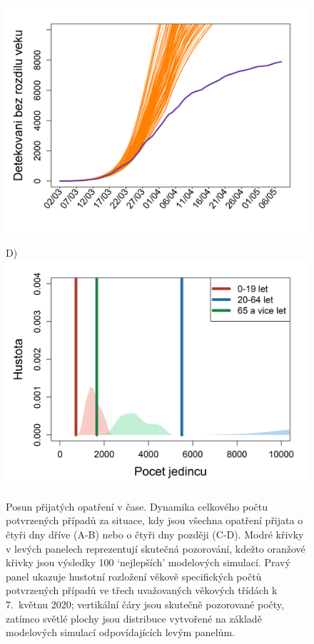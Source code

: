 \begin{figure}
\begin{center}
\begin{minipage}[m]{0.45\textwidth}
			\includegraphics[width = \textwidth]{pic/sc_4later.png}
		\end{minipage}
		\begin{minipage}[m]{0.45\textwidth}
			D) \\
			\includegraphics[width = \textwidth]{pic/sc_4later_PDF.png}
		\end{minipage}
	\end{center}
	\caption{Posun přijatých opatření v čase. Dynamika celkového počtu potvrzených případů za situace, kdy jsou všechna opatření přijata o čtyři dny dříve (A-B) nebo o čtyři dny později (C-D). Modré křivky v levých panelech reprezentují skutečná pozorování, kdežto oranžové křivky jsou výsledky 100 `nejlepších' modelových simulací. Pravý panel ukazuje hustotní rozložení věkově specifických počtů potvrzených případů ve třech uvažovaných věkových třídách k 7.\ květnu 2020; vertikální čáry jsou skutečně pozorované počty, zatímco světlé plochy jsou distribuce vytvořené na základě modelových simulací odpovídajících levým panelům.}
	\label{scenariosR1R2}
\end{figure}

